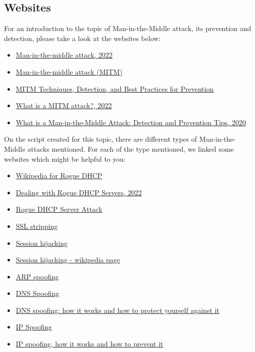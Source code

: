 \subsection{Websites}
For an introduction to the topic of Man-in-the-Middle attack, its prevention and detection, please take a look at the websites below: 
\begin{itemize}
    \item \href{https://www.techtarget.com/iotagenda/definition/man-in-the-middle-attack-MitM}{Man-in-the-middle attack, 2022}
    \item \href{https://www.veracode.com/security/man-middle-attack}{Man-in-the-middle attack (MITM)}
    \item \href{https://www.rapid7.com/fundamentals/man-in-the-middle-attacks/}{MITM Techniques, Detection, and Best Practices for Prevention}
    \item \href{https://www.crowdstrike.com/cybersecurity-101/man-in-the-middle-mitm-attacks/}{What is a MITM attack?, 2022}
    \item \href{https://www.varonis.com/blog/man-in-the-middle-attack}{What is a Man-in-the-Middle Attack: Detection and Prevention Tips, 2020}
\end{itemize}

On the script created for this topic, there are different types of Man-in-the-Middle attacks mentioned. 
For each of the type mentioned, we linked some websites which might be helpful to you:

\begin{itemize}
    \item \href{https://en.wikipedia.org/wiki/Rogue_DHCP}{Wikipedia for Rogue DHCP}
    \item \href{https://www.auvik.com/franklyit/blog/rogue-dhcp-server/}{Dealing with Rogue DHCP Servers, 2022}
    \item \href{https://info-savvy.com/rogue-dhcp-server-attack/}{Rogue DHCP Server Attack}
    \item \href{https://www.https.in/ssl-security/how-ssl-strip-work/}{SSL stripping}
    \item \href{https://www.venafi.com/blog/what-session-hijacking}{Session hijacking}
    \item \href{https://en.wikipedia.org/wiki/Session_hijacking}{Session hijacking - wikipedia page}
    \item \href{https://www.imperva.com/learn/application-security/arp-spoofing/}{ARP spoofing}
    \item \href{https://www.kaspersky.com/resource-center/definitions/dns}{DNS Spoofing}
    \item \href{https://www.ionos.com/digitalguide/server/security/dns-spoofing/}{DNS spoofing: how it works and how to protect yourself against it}
    \item \href{https://www.cloudflare.com/en-gb/learning/ddos/glossary/ip-spoofing/}{IP Spoofing}
    \item \href{https://www.kaspersky.com/resource-center/threats/ip-spoofing}{IP spoofing, how it works and how to prevent it}
\end{itemize}

